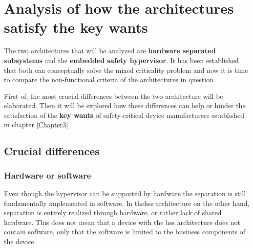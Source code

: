 
\chapter{Analysis of how the architectures satisfy the key wants} %

\label{Chapter4} %


\newcommand{\keyword}[1]{\textbf{#1}}
\newcommand{\tabhead}[1]{\textbf{#1}}
\newcommand{\code}[1]{\texttt{#1}}
\newcommand{\file}[1]{\texttt{\bfseries#1}}
\newcommand{\option}[1]{\texttt{\itshape#1}}


The two  architectures that will be analyzed are \keyword{hardware separated subsystems} and the \keyword{embedded safety hypervisor}. It has been established that both can conceptually solve the mixed criticality problem and now it is time to compare the non-functional criteria of the architectures in question. 

First of, the most crucial differences between the two architecture will be elaborated. Then it will be explored how these differences can help or hinder the satisfaction of the \keyword{key wants} of safety-critical device manufacturers established in chapter \ref{Chapter3}. 

\section{Crucial differences}
\subsection{Hardware or software}
Even though the hypervisor can be supported by hardware the separation is still fundamentally implemented in software. In the\acrshort{hss} architecture on the other hand, separation is entirely realized through hardware, or rather lack of shared hardware. This does not mean that a device with the \acrshort{hss} architecture does not contain software, only that the software is limited to the business components of the device.

